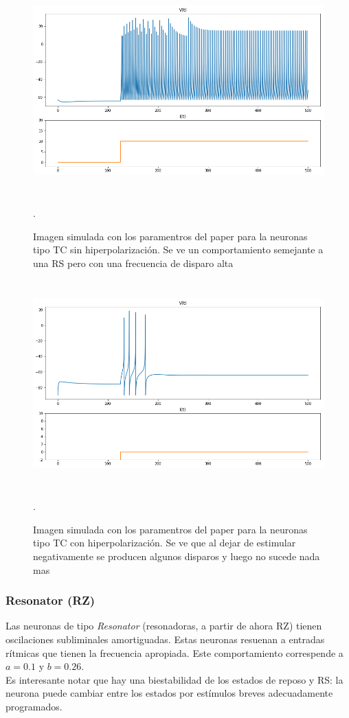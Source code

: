 \documentclass[12pt]{article}
\begin{document}
\begin{figure}[h!]
    \centering
        \includegraphics[height=8cm]{images/TC_normal.png}
    \caption[fontsize=2pt]{Imagen simulada con los paramentros del paper para la neuronas tipo TC sin hiperpolarización. Se ve un comportamiento semejante a una RS pero con una frecuencia de disparo alta}.
\end{figure}
\newpage

\begin{figure}[h!]
    \centering
        \includegraphics[height=8cm]{images/TC_hiper.png}
    \caption[fontsize=2pt]{Imagen simulada con los paramentros del paper para la neuronas tipo TC con hiperpolarización. Se ve que al dejar de estimular negativamente se producen algunos disparos y luego no sucede nada mas}.
\end{figure}
\newpage

\subsubsection{Resonator (RZ)}
Las neuronas de tipo \textit{Resonator} (resonadoras, a partir de ahora RZ) tienen oscilaciones subliminales amortiguadas. Estas neuronas resuenan a entradas rítmicas que tienen la frecuencia apropiada.
Este comportamiento correspende a $a = 0.1$ y $b = 0.26$. \\
Es interesante notar que hay una biestabilidad de los estados de reposo y RS: la neurona puede cambiar entre los estados por estímulos breves adecuadamente programados.
\end{document}

